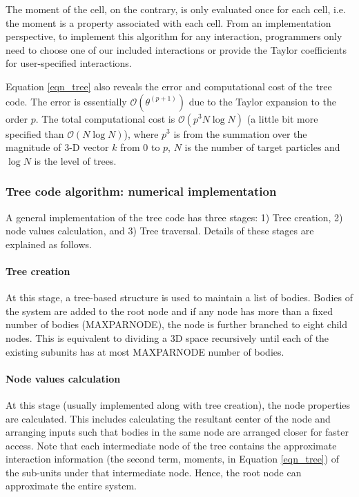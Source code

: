 \documentclass[draftclsnofoot]{elsarticle}
\begin{document}
{ 
The moment of the cell, on the contrary, is only evaluated once for each cell, i.e. the moment is a property associated with each cell. 
From an implementation perspective, to 
implement this algorithm for any interaction, programmers only need to choose one of our included interactions or provide the Taylor coefficients for user-specified interactions. 

Equation \ref{eqn_tree} also reveals the error and computational cost of the tree code. The error is essentially $\mathcal{O}(\theta^{(p+1)})$ due to the Taylor expansion to the order $p$. The total computational cost is $\mathcal{O}(p^3N \log N)$ (a little bit more specified than $\mathcal{O}(N\log N)$), where $p^3$ is from the summation over the magnitude of 3-D vector $k$ from 0 to $p$, $N$ is the number of target particles and $\log N$ is the level of trees. 
 
}

\subsubsection{Tree code algorithm: numerical implementation}
A general implementation of the tree code has three stages: 1) Tree creation, 2) node values calculation, and 3) Tree traversal. Details of these stages are explained as follows.
\paragraph{ Tree creation} At this stage, a tree-based structure is used to maintain a list of bodies.  Bodies of the system are added to the root node  and if any node
has more than a fixed number of  bodies (MAXPARNODE), the node is further branched to eight child nodes. This is equivalent to dividing a 3D space recursively until each of the existing subunits has at most MAXPARNODE number of bodies. 

\paragraph{Node values calculation}
At this stage (usually implemented along with tree creation), the node  properties are calculated. This includes calculating the resultant center of the node and arranging 
inputs such that bodies in the same node are arranged closer for faster access. Note that each intermediate node of the tree contains the approximate interaction 
information (the second term, moments, in Equation \ref{eqn_tree}) of the sub-units under that intermediate node.  Hence, the root node can approximate the entire system. 
 
\end{document}
